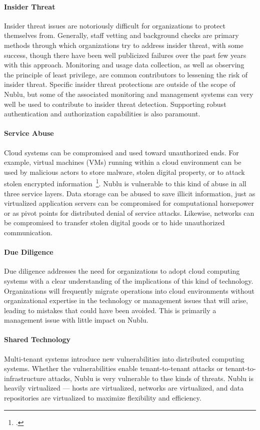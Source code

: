 \documentclass[10pt,letterpaper]{article}
\begin{document}
\paragraph{Insider Threat} Insider threat issues are notoriously difficult for organizations to protect themselves from.  Generally, staff vetting and background checks are primary methods through which organizations try to address insider threat, with some success, though there have been well publicized failures over the past few years with this approach.  Monitoring and usage data collection, as well as observing the principle of least privilege, are common contributors to lessening the risk of insider threat.  Specific insider threat protections are outside of the scope of Nublu, but some of the associated monitoring and management systems can very well be used to contribute to insider threat detection.  Supporting robust authentication and authorization capabilities is also paramount.

\paragraph{Service Abuse} Cloud systems can be compromised and used toward unauthorized ends.  For example, virtual machines (VMs) running within a cloud environment can be used by malicious actors to store malware, stolen digital property, or to attack stolen encrypted information~\footcite{ZhJuReRi:12}.  Nublu is vulnerable to this kind of abuse in all three service layers.  Data storage can be abused to save illicit information, just as virtualized application servers can be compromised for computational horsepower or as pivot points for distributed denial of service attacks.  Likewise, networks can be compromised to transfer stolen digital goods or to hide unauthorized communication.

\paragraph{Due Diligence} Due diligence addresses the need for organizations to adopt cloud computing systems with a clear understanding of the implications of this kind of technology.  Organizations will frequently migrate operations into cloud environments without organizational expertise in the technology or management issues that will arise, leading to mistakes that could have been avoided.  This is primarily a management issue with little impact on Nublu.

\paragraph{Shared Technology} Multi-tenant systems introduce new vulnerabilities into distributed computing systems.  Whether the vulnerabilities enable tenant-to-tenant attacks or tenant-to-infrastructure attacks, Nublu is very vulnerable to thse kinds of threats.  Nublu is heavily virtualized --- hosts are virtualized, networks are virtualized, and data repositories are virtualized to maximize flexibility and efficiency.
\end{document}
